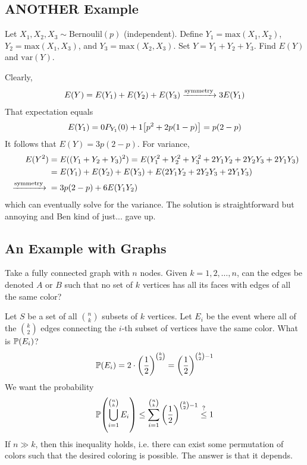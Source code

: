 \subsection{ANOTHER Example}
\begin{proposition}
    Let $X_1, X_2, X_3 \sim \text{Bernoulil}(p)$ (independent). Define $Y_1 = \text{max}(X_1, X_2)$, $Y_2 = \text{max}(X_1, X_3)$, and $Y_3 = \text{max}(X_2, X_3)$. Set $Y = Y_1 + Y_2 + Y_3$. Find $E(Y)$ and $\text{var}(Y)$.
\end{proposition}
\begin{solution}
    Clearly,
    \begin{align}
        E(Y) = E(Y_1) + E(Y_2) + E(Y_3) \ce{->[symmetry]} 3E(Y_1)
    \end{align}
    That expectation equals
    \begin{align}
        E(Y_1) = 0P_{Y_1}(0) + 1\qty[p^2 + 2p(1-p)] = p(2-p)
    \end{align}
    It follows that $E(Y) = 3p(2-p)$. For variance,
    \begin{align}
        E(Y^2) &= E((Y_1 + Y_2 + Y_3)^2) = E(Y_1^2 + Y_2^2 + Y_3^2 + 2Y_1Y_2 + 2Y_2Y_3 + 2Y_1Y_3)\\
        &= E(Y_1) + E(Y_2) + E(Y_3) + E(2Y_1Y_2 + 2Y_2Y_3 + 2Y_1Y_3)\\
        \ce{->[symmetry]} &= 3p(2-p) + 6E(Y_1Y_2)
    \end{align}
    which can eventually solve for the variance. The solution is straightforward but annoying and Ben kind of just... gave up.
\end{solution}


\subsection{An Example with Graphs}
\begin{proposition}
    Take a fully connected graph with $n$ nodes. Given $k = 1, 2, \ldots, n$, can the edges be denoted $A$ or $B$ such that no set of $k$ vertices has all its faces with edges of all the same color?
\end{proposition}
\begin{solution}
    Let $S$ be a set of all $\binom{n}{k}$ subsets of $k$ vertices. Let $E_i$ be the event where all of the $\binom{k}{2}$ edges connecting the $i$-th subset of vertices have the same color. What is $\mathbb{P}(E_i)$?
    \begin{align}
        \mathbb{P}(E_i) = 2 \cdot \qty(\frac{1}{2})^{\binom{k}{2}} = \qty(\frac{1}{2})^{\binom{k}{2} - 1}
    \end{align}
    We want the probability
    \begin{align}
        \mathbb{P}\qty(\bigcup_{i=1}^{\binom{n}{k}} E_i) \le \sum_{i=1}^{\binom{n}{k}} \qty(\frac{1}{2})^{\binom{k}{2} - 1} \stackrel{?}{\le} 1
    \end{align}
    If $n \gg k$, then this inequality holds, i.e. there can exist some permutation of colors such that the desired coloring is possible. The answer is that it depends.
\end{solution}


